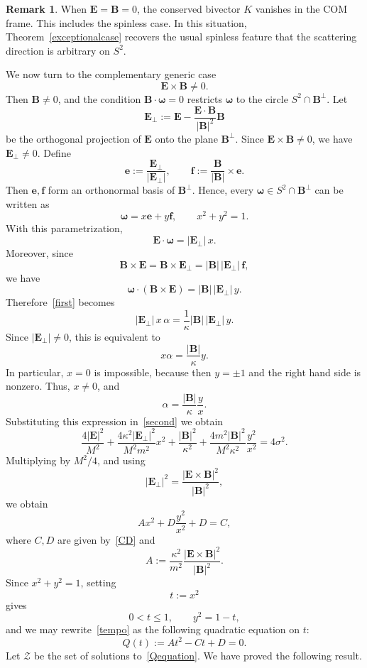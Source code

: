 \documentclass[12pt]{article}
\theoremstyle{plain}
\theoremstyle{definition}
\newtheorem{remark}[theorem]{Remark}
\begin{document}
\begin{remark}
When ${\bm E}={\bm B}=0$, the conserved bivector $K$ vanishes in the COM frame. This includes the spinless case. In this situation, Theorem~\ref{exceptionalcase} recovers the usual spinless feature that the scattering direction is arbitrary on $S^2$.
\end{remark}
We now turn to the complementary generic case
\[
{\bm E}\times{\bm B}\neq0.
\]
Then ${\bm B}\neq0$, and the condition ${\bm B}\cdot{\bm \omega}=0$ restricts ${\bm \omega}$ to the circle $
S^2\cap{\bm B}^{\perp}$.
Let
\[
{\bm E}_{\perp}:={\bm E}-\frac{{\bm E}\cdot{\bm B}}{|{\bm B}|^2}{\bm B}
\]
be the orthogonal projection of ${\bm E}$ onto the plane ${\bm B}^{\perp}$. Since ${\bm E}\times{\bm B}\neq0$, we have ${\bm E}_{\perp}\neq0$. Define
\begin{equation}\label{basis}
{\bm e}:=\frac{{\bm E}_{\perp}}{|{\bm E}_{\perp}|},\qquad{\bm f}:=\frac{{\bm B}}{|{\bm B}|}\times{\bm e}.
\end{equation}
Then ${\bm e},{\bm f}$ form an orthonormal basis of ${\bm B}^{\perp}$. Hence, every ${\bm \omega}\in S^2\cap{\bm B}^{\perp}$ can be written as
\[
{\bm \omega}=x{\bm e}+y{\bm f},\qquad x^2+y^2=1.
\]
With this parametrization,
\[
{\bm E}\cdot{\bm \omega}=|{\bm E}_{\perp}|\,x.
\]
Moreover, since
\[
{\bm B}\times{\bm E}={\bm B}\times{\bm E}_{\perp}=|{\bm B}|\,|{\bm E}_{\perp}|\,{\bm f},
\]
we have
\[
{\bm \omega}\cdot({\bm B}\times{\bm E})=|{\bm B}|\,|{\bm E}_{\perp}|\,y.
\]
Therefore~\eqref{first} becomes
\[
|{\bm E}_{\perp}|\,x\,\alpha=\frac1\kappa|{\bm B}|\,|{\bm E}_{\perp}|\,y.
\]
Since $|{\bm E}_{\perp}|\neq0$, this is equivalent to
\[
x\alpha=\frac{|{\bm B}|}{\kappa}y.
\]
In particular, $x=0$ is impossible, because then $y=\pm1$ and the right hand side is nonzero. Thus, $x\neq0$, and
\[
\alpha=\frac{|{\bm B}|}{\kappa}\frac{y}{x}.
\]
Substituting this expression in~\eqref{second} we obtain
\[
\frac{4|{\bm E}|^2}{M^2}+\frac{4\kappa^2 |{\bm E}_{\perp}|^2}{M^2m^2}x^2+\frac{|{\bm B}|^2}{\kappa^2}+
\frac{4m^2|{\bm B}|^2}{M^2\kappa^2}\frac{y^2}{x^2}=4\sigma^2.
\]
Multiplying by \(M^2/4\), and using
\[
|{\bm E}_{\perp}|^2=\frac{|{\bm E}\times{\bm B}|^2}{|{\bm B}|^2},
\]
we obtain
\begin{equation}\label{tempo}
A x^2+D\frac{y^2}{x^2}+D=C,
\end{equation}
where $C,D$ are given by~\eqref{CD} and
\begin{equation}\label{A}
A:=\frac{\kappa^2}{m^2}\frac{|{\bm E}\times{\bm B}|^2}{|{\bm B}|^2}.
\end{equation}
Since $x^2+y^2=1$, setting
\[
t:=x^2
\]
gives
\[
0<t\leq1,\qquad y^2=1-t,
\]
and we may rewrite~\eqref{tempo} as the following quadratic equation on $t$:
\begin{equation}\label{Qequation}
Q(t):=A t^2-Ct+D=0.
\end{equation}
Let $\mathcal{Z}$ be the set of solutions to~\eqref{Qequation}.
We have proved the following result.
\end{document}
